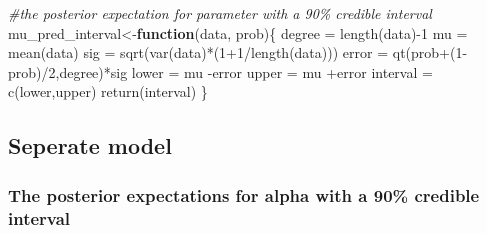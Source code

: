 \documentclass[
]{article}
\newenvironment{Shaded}{\begin{snugshade}}{\end{snugshade}}
\newcommand{\CommentTok}[1]{\textcolor[rgb]{0.56,0.35,0.01}{\textit{#1}}}
\newcommand{\ControlFlowTok}[1]{\textcolor[rgb]{0.13,0.29,0.53}{\textbf{#1}}}
\newcommand{\DecValTok}[1]{\textcolor[rgb]{0.00,0.00,0.81}{#1}}
\newcommand{\FunctionTok}[1]{\textcolor[rgb]{0.00,0.00,0.00}{#1}}
\newcommand{\NormalTok}[1]{#1}
\newcommand{\OtherTok}[1]{\textcolor[rgb]{0.56,0.35,0.01}{#1}}
\newcommand{\SpecialCharTok}[1]{\textcolor[rgb]{0.00,0.00,0.00}{#1}}
\begin{document}
\begin{Shaded}
\begin{Highlighting}[]
\CommentTok{\#the posterior expectation for parameter with a 90\% credible interval}
\NormalTok{mu\_pred\_interval}\OtherTok{\textless{}{-}}\ControlFlowTok{function}\NormalTok{(data, prob)\{}
\NormalTok{degree }\OtherTok{=} \FunctionTok{length}\NormalTok{(data)}\SpecialCharTok{{-}}\DecValTok{1}
\NormalTok{mu }\OtherTok{=} \FunctionTok{mean}\NormalTok{(data)}
\NormalTok{sig }\OtherTok{=} \FunctionTok{sqrt}\NormalTok{(}\FunctionTok{var}\NormalTok{(data)}\SpecialCharTok{*}\NormalTok{(}\DecValTok{1}\SpecialCharTok{+}\DecValTok{1}\SpecialCharTok{/}\FunctionTok{length}\NormalTok{(data)))}
\NormalTok{error }\OtherTok{=} \FunctionTok{qt}\NormalTok{(prob}\SpecialCharTok{+}\NormalTok{(}\DecValTok{1}\SpecialCharTok{{-}}\NormalTok{prob)}\SpecialCharTok{/}\DecValTok{2}\NormalTok{,degree)}\SpecialCharTok{*}\NormalTok{sig}
\NormalTok{lower }\OtherTok{=}\NormalTok{ mu }\SpecialCharTok{{-}}\NormalTok{error}
\NormalTok{upper }\OtherTok{=}\NormalTok{ mu }\SpecialCharTok{+}\NormalTok{error}
\NormalTok{interval }\OtherTok{=} \FunctionTok{c}\NormalTok{(lower,upper)}
\FunctionTok{return}\NormalTok{(interval)}
\NormalTok{\}}
\end{Highlighting}
\end{Shaded}

\hypertarget{seperate-model}{%
\subsection{Seperate model}\label{seperate-model}}

\hypertarget{the-posterior-expectations-for-alpha-with-a-90-credible-interval}{%
\subsubsection{The posterior expectations for alpha with a 90\% credible
interval}\label{the-posterior-expectations-for-alpha-with-a-90-credible-interval}}
\end{document}
